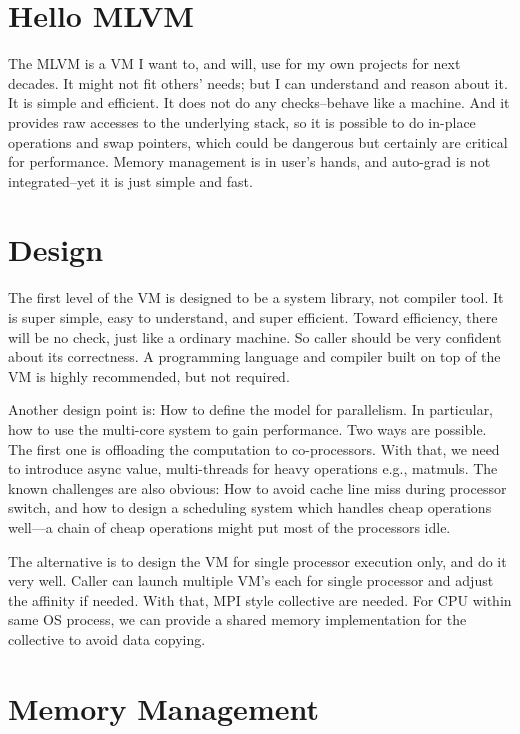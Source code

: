 
\notespagesize

\section{Hello MLVM}

The MLVM is a VM I want to, and will, use for my own projects for next decades.
It might not fit others' needs; but I can understand and reason about it. It is
simple and efficient. It does not do any checks--behave like a machine. And it
provides raw accesses to the underlying stack, so it is possible to do in-place
operations and swap pointers, which could be dangerous but certainly are
critical for performance. Memory management is in user's hands, and auto-grad is
not integrated--yet it is just simple and fast.


\section{Design}

The first level of the VM is designed to be a system library, not compiler tool.
It is super simple, easy to understand, and super efficient. Toward efficiency,
there will be no check, just like a ordinary machine. So caller should be very
confident about its correctness. A programming language and compiler built on
top of the VM is highly recommended, but not required.

Another design point is: How to define the model for parallelism. In particular,
how to use the multi-core system to gain performance. Two ways are possible. The
first one is offloading the computation to co-processors. With that, we need to
introduce async value, multi-threads for heavy operations e.g., matmuls. The
known challenges are also obvious: How to avoid cache line miss during processor
switch, and how to design a scheduling system which handles cheap operations
well---a chain of cheap operations might put most of the processors idle.

The alternative is to design the VM for single processor execution only, and do
it very well. Caller can launch multiple VM's each for single processor and
adjust the affinity if needed. With that, MPI style collective are needed. For
CPU within same OS process, we can provide a shared memory implementation for
the collective to avoid data copying.

\section{Memory Management}

